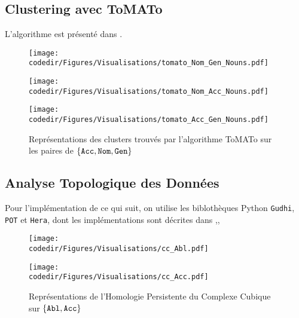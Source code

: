 \subsection{Clustering avec ToMATo}
L'algorithme est présenté dans \cite{ToMATo}.
\begin{figure}[H]
    \begin{center}
        \begin{minipage}{.5\textwidth}
            \begin{center}
                \texttt{[image: \\codedir/Figures/Visualisations/tomato\_Nom\_Gen\_Nouns.pdf]}
            \end{center}
        \end{minipage}
    \end{center}

    \begin{minipage}{.5\textwidth}
        \begin{center}
            \texttt{[image: \\codedir/Figures/Visualisations/tomato\_Nom\_Acc\_Nouns.pdf]}
        \end{center}
    \end{minipage}
    \begin{minipage}{.5\textwidth}
        \begin{center}
            \texttt{[image: \\codedir/Figures/Visualisations/tomato\_Acc\_Gen\_Nouns.pdf]}
        \end{center}
    \end{minipage}
    \caption{Représentations des clusters trouvés par l'algorithme ToMATo sur les paires de $\{\tt Acc,Nom,Gen\}$}
\end{figure}

\subsection{Analyse Topologique des Données}
Pour l'implémentation de ce qui suit, on utilise les biblothèques Python \texttt{Gudhi}, \texttt{POT} et \texttt{Hera}, dont les implémentations sont décrites dans \cite{Gudhi},\cite{PythonPOT}, \cite{Hera}
\begin{figure}[H]
    \begin{minipage}{.5\textwidth}
        \begin{center}
            \texttt{[image: \\codedir/Figures/Visualisations/cc\_Abl.pdf]}
        \end{center}
    \end{minipage}
    \begin{minipage}{.5\textwidth}
        \begin{center}
            \texttt{[image: \\codedir/Figures/Visualisations/cc\_Acc.pdf]}
        \end{center}
    \end{minipage}
    \caption{Représentations de l'Homologie Persistente du Complexe Cubique sur $\{\tt Abl,Acc\}$}
\end{figure}

